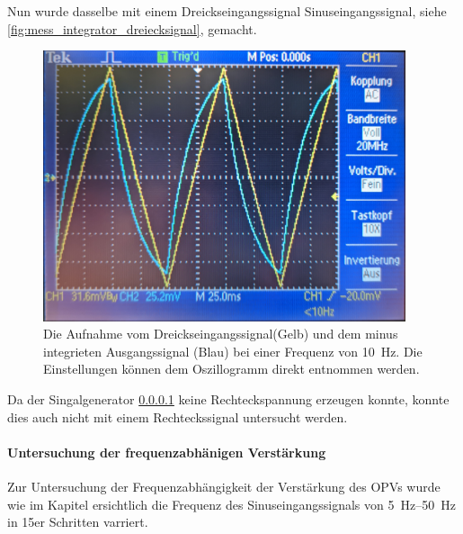 \documentclass[12pt,english,ngerman]{scrartcl}
\begin{document}
Nun wurde dasselbe mit einem Dreickseingangssignal
Sinuseingangssignal, siehe \autoref{fig:mess_integrator_dreiecksignal}, gemacht.

\begin{figure}[H]
  \centering
    \includegraphics[width=0.95\textwidth]{./figures/integrator/dreiecksignal.jpg}
  \caption{Die Aufnahme vom Dreickseingangssignal(Gelb) und dem minus integrieten
  Ausgangssignal (Blau) bei einer Frequenz von \SI{10}{\hertz}. Die
  Einstellungen können dem Oszillogramm direkt entnommen werden.}
  \label{fig:mess_integrator_dreiecksignal}
\end{figure}

Da der Singalgenerator \ref{} keine Rechteckspannung erzeugen konnte, konnte
dies auch nicht mit einem Rechteckssignal untersucht werden.


\paragraph{Untersuchung der frequenzabhänigen Verstärkung}
Zur Untersuchung der Frequenzabhängigkeit der Verstärkung des OPVs wurde wie im
Kapitel  ersichtlich die Frequenz des
Sinuseingangssignals von \SIrange{5}{50}{\hertz} in 15er Schritten varriert.
\end{document}

